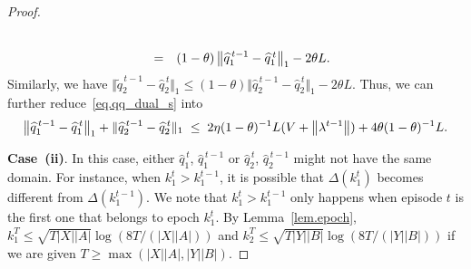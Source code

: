 \documentclass[12pt, final]{l4dc2023}
\begin{document}
\begin{proof}
\[\begin{array}{rcl}
{	}
	\\[0.2cm]
	&=& (1-\theta) \left\|{\widehat {q}_1^{\,t-1}-\widehat q_1^{\,t}}\right\|_1 -2\theta L.
	\end{array}
	\]
	Similarly, we have $\Vert{ \tilde q_2^{\,t-1}-\hat q_2^{\,t} }\Vert_1 \leq (1-\theta) \Vert{\hat {q}_2^{\,t-1}-\hat q_2^{\,t}}\Vert_1 -2\theta L$. Thus, we can further reduce~\eqref{eq.qq_dual_s} into
	\begin{equation}\label{eq.case(i)_s}
	\left\|{\widehat {q}_1^{\,t-1}-\widehat q_1^{\,t}}\right\|_1 +\Vert{\widehat{q}_2^{\,t-1}-\widehat q_2^{\,t}}\Vert_1 
	\;\leq\;
	2\eta (1-\theta)^{-1} L (V + \left\|{\lambda^{t-1}}\right\|) + 4 \theta (1-\theta)^{-1}  L.
	\end{equation}
	
	\noindent\textbf{Case~(ii)}. In this case, either $\hat q_1^{\,t}$, $\hat q_1^{\,t-1}$ or $ \hat q_2^{\,t}$, $\hat q_2^{\,t-1}$ might not have the same domain. For instance, when $k_1^t>k_1^{t-1}$, it is possible that $\Delta(k_1^{t})$ becomes different from $\Delta(k_1^{t-1})$. We note that $k_1^t>k_1^{t-1}$ only happens when episode $t$ is the first one that belongs to epoch $k_1^t$. By Lemma~\ref{lem.epoch}, $k_1^T \leq \sqrt{ T|X||A|}\log (8T/(|X||A|))$ and  $k_2^T \leq \sqrt{ T|Y||B|}\log (8T/(|Y||B|))$ if we are given $T\geq \max(|X||A|, |Y||B|)$.
	

\end{proof}
\end{document}

